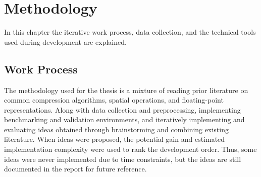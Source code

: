 \chapter{Methodology}
In this chapter the iterative work process, data collection, and the technical tools used during development are explained.
\section{Work Process}

The methodology used for the thesis is a mixture of reading prior literature on common compression algorithms, spatial operations, and floating-point representations. Along with data collection and preprocessing, implementing benchmarking and validation environments, and iteratively implementing and evaluating ideas obtained through brainstorming and combining existing literature. When ideas were proposed, the potential gain and estimated implementation complexity were used to rank the development order. Thus, some ideas were never implemented due to time constraints, but the ideas are still documented in the report for future reference.   

